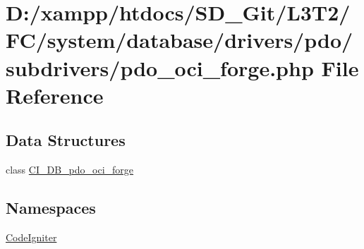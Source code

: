 \hypertarget{system_2database_2drivers_2pdo_2subdrivers_2pdo__oci__forge_8php}{}\section{D\+:/xampp/htdocs/\+S\+D\+\_\+\+Git/\+L3\+T2/\+F\+C/system/database/drivers/pdo/subdrivers/pdo\+\_\+oci\+\_\+forge.php File Reference}
\label{system_2database_2drivers_2pdo_2subdrivers_2pdo__oci__forge_8php}
\subsection*{Data Structures}
\begin{DoxyCompactItemize}
\item 
class \hyperlink{class_c_i___d_b__pdo__oci__forge}{C\+I\+\_\+\+D\+B\+\_\+pdo\+\_\+oci\+\_\+forge}
\end{DoxyCompactItemize}
\subsection*{Namespaces}
\begin{DoxyCompactItemize}
\item 
 \hyperlink{namespace_code_igniter}{Code\+Igniter}
\end{DoxyCompactItemize}
